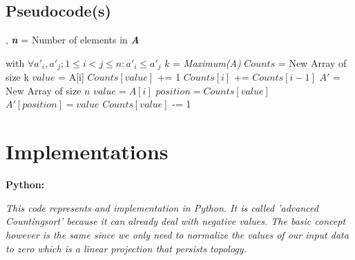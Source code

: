 \documentclass{article}
\newcommand{\implementation}[3]{
    \textbf{#1:}
    #2
    \textit{#3}
}
\newcommand{\implementationfromfile}[3]{
    \lstset{style=codeblock}
    \implementation{#1}{}{#3}
}
\newcommand{\variable}[1]{
    \textit{\textbf{#1}}
}
\begin{document}
        \subsection{Pseudocode(s)}
        \begin{algorithmic}
            \Input{\variable{A} = [$a_1,a_2,...,a_n$]}, \variable{n} = Number of elements in\variable{A}
            \Output{\variable{A'} = [$a'_1,a'_2,...,a'_n$]} with $\forall a'_i,a'_j; 1 \leq i < j\leq n:a'_i\leq a'_j$
                \State$k$ = \textit{Maximum(A)}
                \State$Counts$ = New Array of size k
                \State
                        \State$value$ = A[i]
                        \State$Counts[value]$ += 1
                    \EndFor
                \State
                        \State$Counts[i]$ += $Counts[i - 1]$
                    \EndFor
                \State$A'$ = New Array of size $n$
                \State
                        \State$value = A[i]$
                        \State$position = Counts[value]$
                        \State$A'[position] = value$
                        \State$Counts[value]$ -= 1
                    \EndFor
            \EndFunction
        \end{algorithmic}
        
    \newpage
    \section{Implementations}
        \implementationfromfile{Python}{Python/code.py}{This code represents and implementation in Python. It is
        called \textit{'advanced Countingsort'} because it can already deal with negative values. The basic concept
        however is the same since we only need to normalize the values of our input data to zero which is a linear
        projection that persists topology.}
\end{document}
